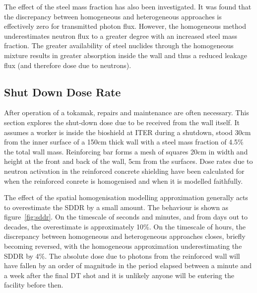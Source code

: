 The effect of the steel mass fraction has also been investigated. It was found that the discrepancy between homogeneous and heterogeneous approaches is effectively zero for transmitted photon flux. However, the homogeneous method underestimates neutron flux to a greater degree with an increased steel mass fraction. The greater availability of steel nuclides through the homogeneous mixture results in greater absorption inside the wall and thus a reduced leakage flux (and therefore dose due to neutrons).


\FloatBarrier
\subsection{Shut Down Dose Rate}
\label{subsec:sddr}
After operation of a tokamak, repairs and maintenance are often necessary. This section explores the shut-down dose due to be received from the wall itself. It assumes a worker is inside the bioshield at ITER during a shutdown, stood 30cm from the inner surface of a 150cm thick wall with a steel mass fraction of 4.5\% the total wall mass. Reinforcing bar forms a mesh of squares 20cm in width and height at the front and back of the wall, 5cm from the surfaces. Dose rates due to neutron activation in the reinforced concrete shielding have been calculated for when the reinforced conrete is homogenised and when it is modelled faithfully.

The effect of the spatial homogenisation modelling approximation generally acts to overestimate the SDDR by a small amount. The behaviour is shown as figure~\ref{fig:sddr}. On the timescale of seconds and minutes, and from days out to decades, the overestimate is approximately 10\%. On the timescale of hours, the discrepancy between homogeneous and heterogeneous approaches closes, briefly becoming reversed, with the homogeneous approximation underestimating the SDDR by 4\%. The absolute dose due to photons from the reinforced wall will have fallen by an order of magnitude in the period elapsed between a minute and a week after the final DT shot and it is unlikely anyone will be entering the facility before then.

